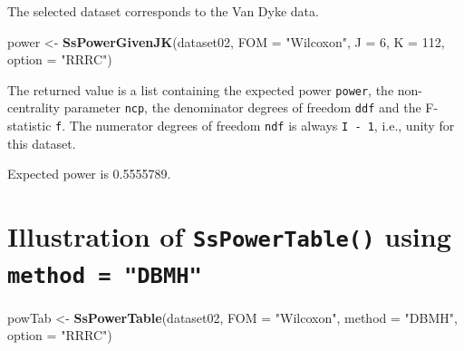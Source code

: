 \documentclass[
]{book}
\newenvironment{Shaded}{\begin{snugshade}}{\end{snugshade}}
\newcommand{\CommentTok}[1]{\textcolor[rgb]{0.56,0.35,0.01}{\textit{#1}}}
\newcommand{\DataTypeTok}[1]{\textcolor[rgb]{0.13,0.29,0.53}{#1}}
\newcommand{\DecValTok}[1]{\textcolor[rgb]{0.00,0.00,0.81}{#1}}
\newcommand{\KeywordTok}[1]{\textcolor[rgb]{0.13,0.29,0.53}{\textbf{#1}}}
\newcommand{\NormalTok}[1]{#1}
\newcommand{\StringTok}[1]{\textcolor[rgb]{0.31,0.60,0.02}{#1}}
\begin{document}
The selected dataset corresponds to the Van Dyke data.

\begin{Shaded}
\begin{Highlighting}[]
\NormalTok{power \textless{}{-}}\StringTok{ }\KeywordTok{SsPowerGivenJK}\NormalTok{(dataset02, }\DataTypeTok{FOM =} \StringTok{"Wilcoxon"}\NormalTok{, }\DataTypeTok{J =} \DecValTok{6}\NormalTok{, }\DataTypeTok{K =} \DecValTok{112}\NormalTok{, }\DataTypeTok{option =} \StringTok{"RRRC"}\NormalTok{)}
\end{Highlighting}
\end{Shaded}

The returned value is a list containing the expected power \texttt{power}, the non-centrality parameter \texttt{ncp}, the denominator degrees of freedom \texttt{ddf} and the F-statistic \texttt{f}. The numerator degrees of freedom \texttt{ndf} is always \texttt{I\ -\ 1}, i.e., unity for this dataset.

\begin{Shaded}
\end{Shaded}

Expected power is 0.5555789.

\hypertarget{illustration-of-sspowertable-using-method-dbmh}{%
\section{\texorpdfstring{Illustration of \texttt{SsPowerTable()} using \texttt{method\ =\ "DBMH"}}{Illustration of SsPowerTable() using method = "DBMH"}}\label{illustration-of-sspowertable-using-method-dbmh}}

\begin{Shaded}
\begin{Highlighting}[]
\NormalTok{powTab \textless{}{-}}\StringTok{ }\KeywordTok{SsPowerTable}\NormalTok{(dataset02, }\DataTypeTok{FOM =} \StringTok{"Wilcoxon"}\NormalTok{, }\DataTypeTok{method =} \StringTok{"DBMH"}\NormalTok{, }\DataTypeTok{option =} \StringTok{"RRRC"}\NormalTok{)}
\end{Highlighting}
\end{Shaded}
\end{document}
